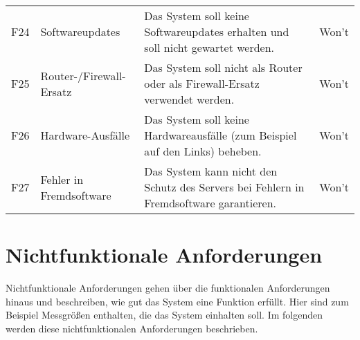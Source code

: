\documentclass[../review_1.tex]{subfiles}
\begin{document}
\begin{longtable} [h] {p{1cm} p{4cm} p{7cm} l}
    F24                                                                                                                                                                                                              & Softwareupdates                                & Das System soll keine Softwareupdates erhalten und soll nicht gewartet werden.                                                                                                                                                                                      & Won't           \\
    F25                                                                                                                                                                                                              & Router-/Firewall-Ersatz                                & Das System soll  nicht als Router oder als Firewall-Ersatz verwendet werden.                                                                                                   & Won't           \\
    F26                                                                                                                                                                                                              & Hardware-Ausfälle                              & Das System soll keine Hardwareausfälle (zum Beispiel auf den Links) beheben.                                             & Won't           \\
    F27                                                                                                                                                                                                              & Fehler in Fremdsoftware                              & Das System kann nicht den Schutz des Servers bei Fehlern in Fremdsoftware garantieren.    & Won't        \\
\bottomrule
\end{longtable} %

\section{Nichtfunktionale Anforderungen}

Nichtfunktionale Anforderungen gehen über die funktionalen Anforderungen hinaus und beschreiben, wie gut das System eine Funktion erfüllt. Hier sind zum Beispiel Messgrößen enthalten, die das System einhalten soll. Im folgenden werden diese nichtfunktionalen Anforderungen beschrieben.
\end{document}
